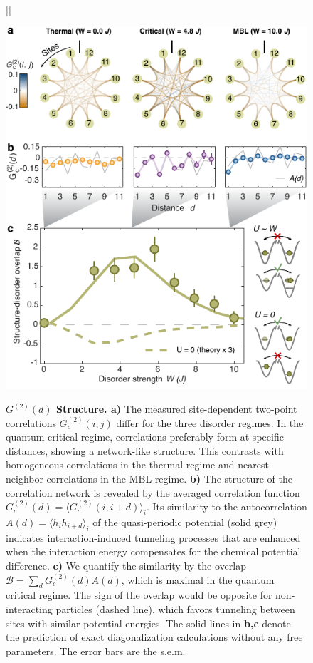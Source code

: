 \begin{figure}[t!]
[\FBwidth]
{\caption{\textbf{$G^{(2)}(d)$ Structure. a)} The measured site-dependent two-point correlations $G^{(2)}_c(i,j)$  differ for the three disorder regimes. In the quantum critical regime, correlations preferably form at specific distances, showing a network-like structure. This contrasts with homogeneous correlations in the thermal regime and nearest neighbor correlations in the MBL regime. \textbf{b)} The structure of the correlation network is revealed by the averaged correlation function $G^{(2)}_c(d)=\langle G^{(2)}_c(i,i+d)\rangle_i$. Its similarity to the autocorrelation $A(d) = \langle h_i h_{i+d}\rangle_i$ of the quasi-periodic potential (solid grey) indicates interaction-induced tunneling processes that are enhanced when the interaction energy compensates for the chemical potential difference. \textbf{c)} We quantify the similarity by the overlap $\mathcal{B}=\sum_d G^{(2)}_c(d) A(d)$, which is maximal in the quantum critical regime. The sign of the overlap would be opposite for non-interacting particles (dashed line), which favors tunneling between sites with similar potential energies. The solid lines in \textbf{b,c} denote the prediction of exact diagonalization calculations without any free parameters. The error bars are the s.e.m.} \label{fig:corrStructure}}
{\includegraphics[width=3 in]{figures/ch6/fig3.pdf} } 
\end{figure}

